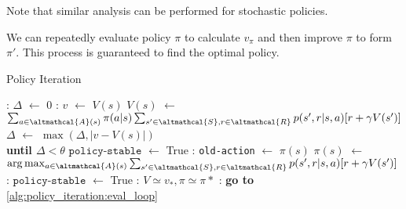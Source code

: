 \documentclass{article}
\newcommand*\Let[2]{\State #1 $\gets$ #2}
\newcommand{\ix}[1]{%
  \leavevmode %
  \marginpar{\small\emph{#1}}%
}
\begin{document}
Note that similar analysis can be performed for stochastic policies.

\ix{Policy Iteration}We can repeatedly evaluate policy $\pi$ to calculate $v_\pi$ and then improve $\pi$ to form $\pi'$.  This process is guaranteed to find the optimal policy. 

\begin{algorithm}
	\caption{Policy Iteration
		\label{alg:policy_iteration}}
	\begin{algorithmic}[1]
		\Statex
	    \Loop:  \label{alg:policy_iteration:eval_loop}
		\Let{$\Delta$}{0}
		: 
		\Let{$v$}{$V(s)$}
		\Let{$V(s)$}{$\sum_{a \in \altmathcal{A}(s)} \pi(a|s) \sum_{s' \in \altmathcal{S}, r \in \altmathcal{R}} p(s', r | s, a) [r + \gamma V(s')]$}
		\Let{$\Delta$}{$\max(\Delta, |v - V(s)|)$}
		\EndFor
		\EndLoop\\\textbf{until $\Delta < \theta$}
		\Statex
		\Let{$\texttt{policy-stable}$}{True} 
		: 
		\Let{\texttt{old-action}}{$\pi(s)$}
		\Let{$\pi(s)$}{$\arg \max_{a \in \altmathcal{A}(s)} \sum_{s' \in \altmathcal{S}, r \in \altmathcal{R}} p(s', r | s, a) [r + \gamma V(s')]$}
		: 
		\Let{$\texttt{policy-stable}$}{True}
		\EndIf
		\EndFor
		:
			\State \Return $V \simeq v_*, \pi 
			\simeq \pi* $
		\Else: \State \textbf{ go to} \ref{alg:policy_iteration:eval_loop}
		\EndIf
	\end{algorithmic}
\end{algorithm}
\end{document}
